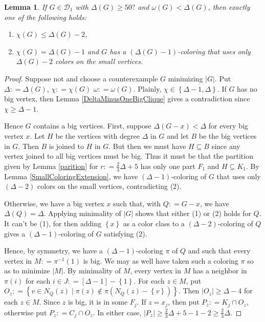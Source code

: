 \documentclass[12pt]{article}
\theoremstyle{plain}
\newtheorem{lem}[thm]{Lemma}
\theoremstyle{definition}
\theoremstyle{remark}
\newcommand{\fancy}[1]{\mathcal{#1}}
\newcommand{\set}[1]{\left\{ #1 \right\}}
\newcommand{\setb}[3]{\left\{ #1 \in #2 \mid #3 \right\}}
\newcommand{\card}[1]{\left|#1\right|}
\newcommand{\irange}[1]{\left[#1\right]}
\newcommand{\DefinedAs}{\mathrel{\mathop:}=}
\def\D{\fancy{D}}
\newcommand{\bigcliqueraw}{\frac{2}{3}\Delta + 5}
\newcommand{\cliqueparts}{\frac{2}{3}\Delta}
\begin{document}
\begin{lem}\label{StrengthenedHypotheses}
If $G \in \D_1$ with $\Delta(G) \geq 50?$ and $\omega(G) < \Delta(G)$, then
exactly one of the following holds:
\begin{enumerate}
  \item $\chi(G) \leq \Delta(G) - 2$,
  \item $\chi(G) = \Delta(G) - 1$ and $G$ has a $(\Delta(G) - 1)$-coloring that
  uses only $\Delta(G) - 2$ colors on the small vertices.
\end{enumerate}
\end{lem}
\begin{proof}
Suppose not and choose a counterexample $G$ minimizing $\card{G}$.  Put $\Delta
\DefinedAs \Delta(G)$, $\chi \DefinedAs \chi(G)$ $\omega \DefinedAs \omega(G)$.
Plainly, $\chi \in \set{\Delta - 1, \Delta}$. If $G$ has no big vertex, then
Lemma \ref{DeltaMinusOneBigClique} gives a contradiction since $\chi \geq
\Delta - 1$.

Hence $G$ contains a big vertices. First, suppose $\Delta(G - x) < \Delta$ for
every big vertex $x$.  Let $H$ be the vertices with degree $\Delta$ in $G$ and
let $B$ be the big vertices in $G$.  Then $B$ is joined to $H$ in $G$.  But then
we must have $H \subseteq B$ since any vertex joined to all big vertices must be
big.  Thus it must be that the partition given by Lemma \ref{parition} for $r
\DefinedAs \bigcliqueraw$ has only one part $F_1$ and $H \subseteq K_1$.  By
Lemma \ref{SmallColoringExtension}, we have $(\Delta - 1)$-coloring of $G$ that
uses only $(\Delta - 2)$ colors on the small vertices, contradicting (2).

Otherwise, we have a big vertex $x$ such that, with $Q \DefinedAs G - x$,
we have $\Delta(Q) = \Delta$. Applying minimality of $\card{G}$ shows that
either (1) or (2) holds for $Q$. It can't be (1), for then adding $\set{x}$ as a
color class to a $(\Delta - 2)$-coloring of $Q$ gives a $(\Delta - 1)$-coloring of $G$ satisfying (2).

Hence, by symmetry, we have a $(\Delta - 1)$-coloring $\pi$ of $Q$
and such that every vertex in $M \DefinedAs \pi^{-1}(1)$ is big.  We may as well
have taken such a coloring $\pi$ so as to minimize $\card{M}$.  By minimality of $M$, every vertex in $M$ has a
neighbor in $\pi(i)$ for each $i \in J \DefinedAs \irange{\Delta - 1} -
\set{1}$.  For each $z \in M$, put $O_z \DefinedAs \setb{v}{N_Q(z)}{\pi(z)
\not \in \pi(N_Q(z) - \set{v})}$.  Then $\card{O_z} \geq \Delta - 4$ for each
$z \in M$.  Since $z$ is big, it is in some $F_j$.  If $z = x_j$, then put $P_z
\DefinedAs K_j \cap O_z$, otherwise put $P_z \DefinedAs C_j \cap O_z$.  In
either case, $\card{P_z} \geq \bigcliqueraw - 1 - 2 \geq \cliqueparts$.


\end{proof}
\end{document}
